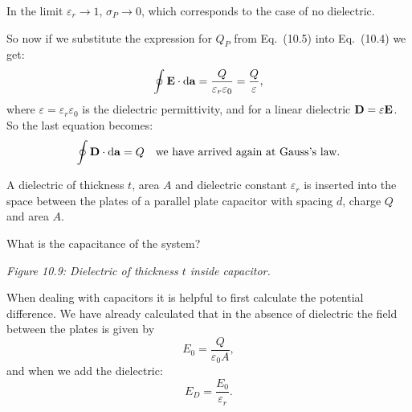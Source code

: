In the limit $\varepsilon_r \to 1$, $\sigma_P \to 0$, which corresponds to the case of no dielectric.

So now if we substitute the expression for $Q_P$ from Eq.~(10.5) into Eq.~(10.4) we get:
\begin{equation*}
    \oint \vb{E} \cdot \dd{\vb{a}} = \frac{Q}{\varepsilon_r \varepsilon_0} = \frac{Q}{\varepsilon},
\end{equation*}
where $\varepsilon = \varepsilon_r \varepsilon_0$ is the dielectric permittivity, and for a linear dielectric $\vb{D} = \varepsilon \vb{E}$. So the last equation becomes:
\begin{equation*}
    \oint \vb{D} \cdot \dd{\vb{a}} = Q \quad \text{we have arrived again at Gauss's law.}
\end{equation*}

\begin{example}
A dielectric of thickness $t$, area $A$ and dielectric constant $\varepsilon_r$ is inserted into the space between the plates of a parallel plate capacitor with spacing $d$, charge $Q$ and area $A$.

What is the capacitance of the system?

\vspace{0.5em}
\noindent
\begin{minipage}{0.48\textwidth}
\centering
{}
\par\smallskip\small\textit{Figure 10.9: Dielectric of thickness $t$ inside capacitor.}
\end{minipage}
\hfill
\begin{minipage}{0.48\textwidth}
When dealing with capacitors it is helpful to first calculate the potential difference. We have already calculated that in the absence of dielectric the field between the plates is given by
\begin{equation}
    E_0 = \frac{Q}{\varepsilon_0 A},
\end{equation}
and when we add the dielectric:
\begin{equation}
    E_D = \frac{E_0}{\varepsilon_r}.
\end{equation}
\end{minipage}


\end{example}
